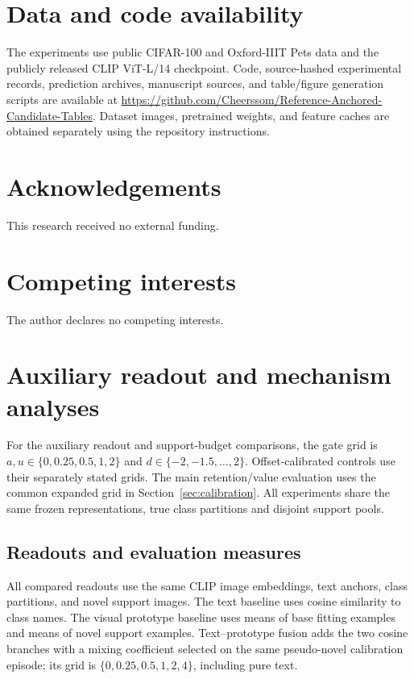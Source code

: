 \documentclass[research]{fcs}
\begin{document}
\section*{Data and code availability}
The experiments use public CIFAR-100 and Oxford-IIIT Pets data and the publicly released CLIP ViT-L/14 checkpoint. Code, source-hashed experimental records, prediction archives, manuscript sources, and table/figure generation scripts are available at \url{https://github.com/Cheerssom/Reference-Anchored-Candidate-Tables}. Dataset images, pretrained weights, and feature caches are obtained separately using the repository instructions.

\section*{Acknowledgements}
This research received no external funding.
\section*{Competing interests}
The author declares no competing interests.




\appendix
\section{Auxiliary readout and mechanism analyses}
\label{app:auxiliary}
For the auxiliary readout and support-budget comparisons, the gate grid is $a,u\in\{0,0.25,0.5,1,2\}$ and $d\in\{-2,-1.5,\ldots,2\}$. Offset-calibrated controls use their separately stated grids. The main retention/value evaluation uses the common expanded grid in Section~\ref{sec:calibration}. All experiments share the same frozen representations, true class partitions and disjoint support pools.

\subsection{Readouts and evaluation measures}
All compared readouts use the same CLIP image embeddings, text anchors, class partitions, and novel support images. The text baseline uses cosine similarity to class names. The visual prototype baseline uses means of base fitting examples and means of novel support examples. Text--prototype fusion adds the two cosine branches with a mixing coefficient selected on the same pseudo-novel calibration episode; its grid is $\{0,0.25,0.5,1,2,4\}$, including pure text.
\end{document}
